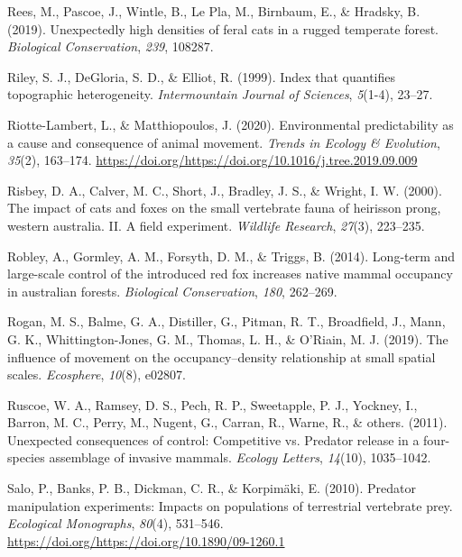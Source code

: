 \documentclass[]{elsarticle} %
\begin{document}
\leavevmode\hypertarget{ref-rees2019}{}%
Rees, M., Pascoe, J., Wintle, B., Le Pla, M., Birnbaum, E., \& Hradsky, B. (2019). Unexpectedly high densities of feral cats in a rugged temperate forest. \emph{Biological Conservation}, \emph{239}, 108287.

\leavevmode\hypertarget{ref-riley1999}{}%
Riley, S. J., DeGloria, S. D., \& Elliot, R. (1999). Index that quantifies topographic heterogeneity. \emph{Intermountain Journal of Sciences}, \emph{5}(1-4), 23--27.

\leavevmode\hypertarget{ref-RIOTTELAMBERT2020163}{}%
Riotte-Lambert, L., \& Matthiopoulos, J. (2020). Environmental predictability as a cause and consequence of animal movement. \emph{Trends in Ecology \& Evolution}, \emph{35}(2), 163--174. \url{https://doi.org/https://doi.org/10.1016/j.tree.2019.09.009}

\leavevmode\hypertarget{ref-risbey2000}{}%
Risbey, D. A., Calver, M. C., Short, J., Bradley, J. S., \& Wright, I. W. (2000). The impact of cats and foxes on the small vertebrate fauna of heirisson prong, western australia. II. A field experiment. \emph{Wildlife Research}, \emph{27}(3), 223--235.

\leavevmode\hypertarget{ref-robley2014}{}%
Robley, A., Gormley, A. M., Forsyth, D. M., \& Triggs, B. (2014). Long-term and large-scale control of the introduced red fox increases native mammal occupancy in australian forests. \emph{Biological Conservation}, \emph{180}, 262--269.

\leavevmode\hypertarget{ref-rogan2019}{}%
Rogan, M. S., Balme, G. A., Distiller, G., Pitman, R. T., Broadfield, J., Mann, G. K., Whittington-Jones, G. M., Thomas, L. H., \& O'Riain, M. J. (2019). The influence of movement on the occupancy--density relationship at small spatial scales. \emph{Ecosphere}, \emph{10}(8), e02807.

\leavevmode\hypertarget{ref-ruscoe2011}{}%
Ruscoe, W. A., Ramsey, D. S., Pech, R. P., Sweetapple, P. J., Yockney, I., Barron, M. C., Perry, M., Nugent, G., Carran, R., Warne, R., \& others. (2011). Unexpected consequences of control: Competitive vs. Predator release in a four-species assemblage of invasive mammals. \emph{Ecology Letters}, \emph{14}(10), 1035--1042.

\leavevmode\hypertarget{ref-https:ux2fux2fdoi.orgux2f10.1890ux2f09-1260.1}{}%
Salo, P., Banks, P. B., Dickman, C. R., \& Korpimäki, E. (2010). Predator manipulation experiments: Impacts on populations of terrestrial vertebrate prey. \emph{Ecological Monographs}, \emph{80}(4), 531--546. \url{https://doi.org/https://doi.org/10.1890/09-1260.1}
\end{document}
